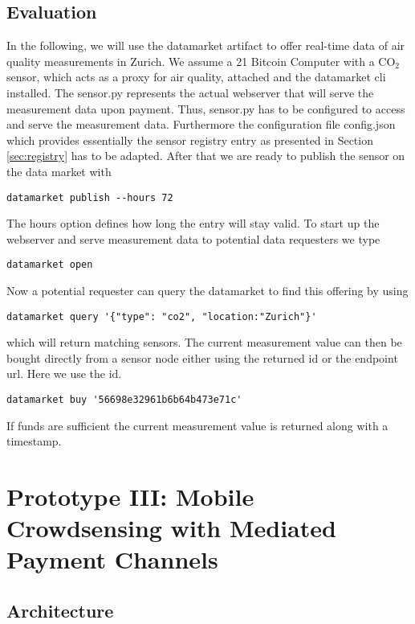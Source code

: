 \subsection{Evaluation}
\label{sec:eval}
In the following, we will use the datamarket artifact to offer real-time data of air quality measurements in Zurich.
We assume a 21 Bitcoin Computer with a CO$_{2}$ sensor, which acts as a proxy for air quality, attached and the datamarket cli installed. The sensor.py represents the actual webserver that will serve the measurement data upon payment. Thus, sensor.py has to be configured to access and serve the measurement data. Furthermore the configuration file config.json which provides essentially the sensor registry entry as presented in Section \ref{sec:registry} has to be adapted. After that we are ready to publish the sensor on the data market with
\begin{lstlisting}[basicstyle=\ttfamily\small]
datamarket publish --hours 72
\end{lstlisting}
The hours option defines how long the entry will stay valid. To start up the webserver and serve measurement data to potential data requesters we type
\begin{lstlisting}[basicstyle=\ttfamily\small]
datamarket open
\end{lstlisting}
Now a potential requester can query the datamarket to find this offering by using
\begin{lstlisting}[basicstyle=\ttfamily\small]
datamarket query '{"type": "co2", "location:"Zurich"}'
\end{lstlisting}
which will return matching sensors. The current measurement value can then be bought directly from a sensor node either using the returned id or the endpoint url. Here we use the id.
\begin{lstlisting}[basicstyle=\ttfamily\small]
datamarket buy '56698e32961b6b64b473e71c'
\end{lstlisting}
If funds are sufficient the current measurement value is returned along with a timestamp.

\section{Prototype III: Mobile Crowdsensing with Mediated Payment Channels}

\subsection{Architecture}

